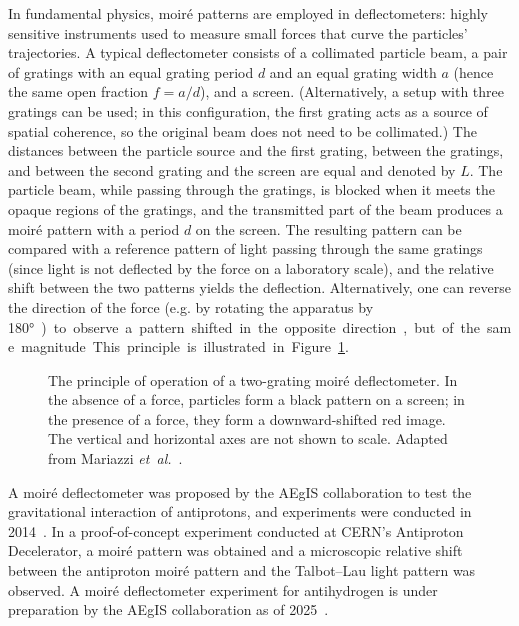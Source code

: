 \documentclass[12pt]{report}
\begin{document}
In fundamental physics, moir\'e patterns are employed in deflectometers: highly sensitive instruments used to measure small forces that curve the particles' trajectories. A typical deflectometer consists of a collimated particle beam, a pair of gratings with an equal grating period \(d\) and an equal grating width \(a\) (hence the same open fraction \(f=a/d\)), and a screen. (Alternatively, a setup with three gratings can be used; in this configuration, the first grating acts as a source of spatial coherence, so the original beam does not need to be collimated.) The distances between the particle source and the first grating, between the gratings, and between the second grating and the screen are equal and denoted by \(L\).
The particle beam, while passing through the gratings, is blocked when it meets the opaque regions of the gratings, and the transmitted part of the beam produces a moir\'e pattern with a period \(d\) on the screen. 
The resulting pattern can be compared with a reference pattern of light passing through the same gratings (since light is not deflected by the force on a laboratory scale), and the relative shift between the two patterns yields the deflection. Alternatively, one can reverse the direction of the force (e.g. by rotating the apparatus by 180\si\degree) to observe a pattern shifted in the opposite direction, but of the same magnitude. This principle is illustrated in Figure \ref{fig:moired}.

\begin{figure}[ht!]
    \centering
    \resizebox{0.95\textwidth}{!}{}
    \caption[Operating principle of the moir\'e deflectometer]{The principle of operation of a two-grating moir\'e deflectometer. In the absence of a force, particles form a black pattern on a screen; in the presence of a force, they form a downward-shifted red image. The vertical and horizontal axes are not shown to scale. Adapted from Mariazzi \emph{et~al.}~\cite{Mariazzi_Caravita_Doser_Nebbia_Brusa_2020}.}
    \label{fig:moired}
    
\end{figure}

A moir\'e deflectometer was proposed by the AEgIS collaboration to test the gravitational interaction of antiprotons, and experiments were conducted in 2014~\cite{Aghion2014}. In a proof-of-concept experiment conducted at CERN's Antiproton Decelerator, a moir\'e pattern was obtained and a microscopic relative shift between the antiproton moir\'e pattern and the Talbot--Lau light pattern was observed. A moir\'e deflectometer experiment for antihydrogen is under preparation by the AEgIS collaboration as of 2025~\cite{Ferguson_AEḡISCollaboration_2025}.
\end{document}
